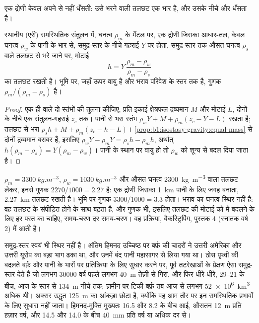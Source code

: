 एक द्रोणी केवल अपने  से नहीं धँसती: उसे भरने वाली तलछट एक भार है, और  उसके नीचे और धँसता है।

\begin{proposition}\label{prop:b1:diagenesis-basins:loading}
स्थानीय (एरी) समस्थितिक संतुलन में, घनत्व $\rho_m$ के मैंटल पर, एक द्रोणी जिसका आधार-तल, केवल घनत्व $\rho_w$ के पानी के भार से, समुद्र-स्तर के नीचे गहराई $Y$ पर होता, समुद्र-स्तर तक औसत घनत्व $\rho_s$ वाले तलछट से भरे जाने पर, मोटाई
\[
  h = Y\,\frac{\rho_m - \rho_w}{\rho_m - \rho_s}
\]
का तलछट रखती है। भूमि पर, जहाँ ऊपर वायु है और भराव परिवेश के स्तर तक है, गुणक $\rho_m/(\rho_m - \rho_s)$ है।
\end{proposition}

\begin{proof}
एक ही  वाले दो स्तंभों की तुलना कीजिए, प्रति इकाई क्षेत्रफल द्रव्यमान $M$ और मोटाई $L$, दोनों के नीचे एक संतुलन-गहराई $z_c$ तक। पानी से भरा स्तंभ $\rho_w Y + M + \rho_m(z_c - Y - L)$ रखता है; तलछट से भरा $\rho_s h + M + \rho_m(z_c - h - L)$। \cref{prop:b1:isostasy-gravity:equal-mass} से दोनों द्रव्यमान बराबर हैं, इसलिए
$\rho_w Y - \rho_m Y = \rho_s h - \rho_m h$, अर्थात् $h(\rho_m - \rho_s) =
Y(\rho_m - \rho_w)$। पानी के स्थान पर वायु हो तो $\rho_w$ को शून्य से बदल दिया जाता है।
\end{proof}

$\rho_m = \qty{3300}{kg.m^{-3}}$, $\rho_w = \qty{1030}{kg.m^{-3}}$ और औसत घनत्व \qty{2300}{kg.m^{-3}} वाला तलछट लेकर, इनसे गुणक $2270/1000 = \num{2.27}$ है: एक द्रोणी जिसका  \qty{1}{km} पानी के लिए जगह बनाता, \qty{2.27}{km} तलछट रखती है। भूमि पर गुणक $3300/1000 = \num{3.3}$ होता। भराव का घनत्व स्थिर नहीं है: वह तलछट के संपीड़ित होने के साथ बढ़ता है, और गुणक भी, इसलिए तलछट की मोटाई को  में बदलने के लिए हर परत का  चाहिए, समय-चरण दर समय-चरण। वह प्रक्रिया, बैकस्ट्रिपिंग, पुस्तक 4 (स्नातक वर्ष 2) में आती है।

समुद्र-स्तर स्वयं भी स्थिर नहीं है। अंतिम हिमनद उच्चिष्ठ पर बर्फ़ की चादरों ने उत्तरी अमेरिका और उत्तरी यूरोप का बड़ा भाग ढका था, और उनमें बंद पानी महासागर से लिया गया था। ठोस पृथ्वी की बदलते बर्फ़ और पानी के भारों पर प्रतिक्रिया के लिए सुधार करने पर, पूर्व तटरेखाओं के प्रेक्षण ऐसा समुद्र-स्तर देते हैं जो लगभग \num{30000} वर्ष पहले लगभग \qty{40}{m} तेज़ी से गिरा, और फिर धीरे-धीरे, \qtyrange{29}{21}{\ka} के बीच, आज के स्तर से \qty{134}{m} नीचे तक; ज़मीन पर टिकी बर्फ़ तब आज से लगभग \qty{52e6}{km^3} अधिक थी। अक्सर उद्धृत \qty{125}{m} का आंकड़ा छोटा है, क्योंकि वह आम तौर पर इन समस्थितिक प्रभावों के लिए सुधारा नहीं जाता। हिमनद-मुक्ति मुख्यतः \qty{16.5}{\ka} और \qty{8.2}{\ka} के बीच आई, औसतन \qty{12}{m} प्रति हज़ार वर्ष, और \qty{14.5}{\ka} और \qty{14.0}{\ka} के बीच \qty{40}{mm} प्रति वर्ष या अधिक दर से।

